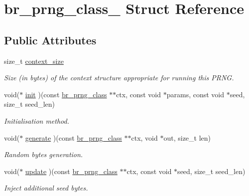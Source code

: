 \hypertarget{structbr__prng__class__}{}\section{br\+\_\+prng\+\_\+class\+\_\+ Struct Reference}
\label{structbr__prng__class__}
\subsection*{Public Attributes}
\begin{DoxyCompactItemize}
\item 
\mbox{\label{structbr__prng__class___a2f3ec37b1ac8e0157489db17de371396}} 
size\+\_\+t \hyperlink{structbr__prng__class___a2f3ec37b1ac8e0157489db17de371396}{context\+\_\+size}
\begin{DoxyCompactList}\small\item\em Size (in bytes) of the context structure appropriate for running this P\+R\+NG. \end{DoxyCompactList}\item 
void($\ast$ \hyperlink{structbr__prng__class___ae54c9bffd6e8aed1099b33a425d0af58}{init} )(const \hyperlink{bearssl__rand_8h_a249aef3beeba050eea56048e6a479fba}{br\+\_\+prng\+\_\+class} $\ast$$\ast$ctx, const void $\ast$params, const void $\ast$seed, size\+\_\+t seed\+\_\+len)
\begin{DoxyCompactList}\small\item\em Initialisation method. \end{DoxyCompactList}\item 
void($\ast$ \hyperlink{structbr__prng__class___a34fa7747beda004295733790bbf9671d}{generate} )(const \hyperlink{bearssl__rand_8h_a249aef3beeba050eea56048e6a479fba}{br\+\_\+prng\+\_\+class} $\ast$$\ast$ctx, void $\ast$out, size\+\_\+t len)
\begin{DoxyCompactList}\small\item\em Random bytes generation. \end{DoxyCompactList}\item 
void($\ast$ \hyperlink{structbr__prng__class___ab26e31262e16bc2d8bf47c2c5b5e6a38}{update} )(const \hyperlink{bearssl__rand_8h_a249aef3beeba050eea56048e6a479fba}{br\+\_\+prng\+\_\+class} $\ast$$\ast$ctx, const void $\ast$seed, size\+\_\+t seed\+\_\+len)
\begin{DoxyCompactList}\small\item\em Inject additional seed bytes. \end{DoxyCompactList}\end{DoxyCompactItemize}


